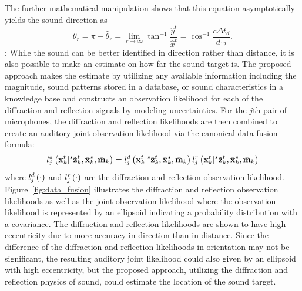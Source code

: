\documentclass[letterpaper, 10 pt, conference]{ieeeconf}  %
\begin{document}
The further mathematical manipulation shows that this equation asymptotically yields the sound direction as 
\begin{equation}\label{eq:dirction_reflection}
\theta_r = \pi - \hat \theta_r = \lim_{r \rightarrow \infty} \tan^{-1} \frac{\hat y^t}{\hat x^t}= \cos^{-1} \frac{c \Delta t_d}{d_{12}}.   
\end{equation}
: 
While the sound can be better identified in direction rather than distance, it is also possible to make an estimate on how far the sound target is.  The proposed approach makes the estimate by utilizing any available information including the magnitude, sound patterns stored in a database, or sound characteristics in a knowledge base and constructs an observation likelihood for each of the diffraction and reflection signals by modeling uncertainties.  For the $j$th pair of microphones, the diffraction and reflection likelihoods are then combined to create an auditory joint observation likelihood via the canonical data fusion formula: 
\begin{equation}\label{eq:joint_auditory}
l_j^{a} \left ( \mathbf{x}_{k}^{t}|{}^{s}\tilde {\mathbf{z}}_{k}^{t},\bar {\mathbf{x}}_{k}^{s},\bar {\mathbf{m}}_{k} \right ) = l_j^{d} \left ( \mathbf{x}_{k}^{t}|{}^{s}\tilde {\mathbf{z}}_{k}^{t},\bar {\mathbf{x}}_{k}^{s},\bar {\mathbf{m}}_{k} \right ) l_j^{r} \left ( \mathbf{x}_{k}^{t}|{}^{s}\tilde {\mathbf{z}}_{k}^{t},\bar {\mathbf{x}}_{k}^{s},\bar {\mathbf{m}}_{k} \right ) 
\end{equation}
where $l_j^{d} \left ( \cdot \right )$ and $l_j^{r} \left ( \cdot \right )$ are the diffraction and reflection observation likelihood.  
Figure~\ref{fig:data_fusion} illustrates the diffraction and reflection observation likelihoods as well as the joint observation likelihood where the observation likelihood is represented by an ellipsoid indicating a probability distribution with a covariance.  The diffraction and reflection likelihoods are shown to have high eccentricity due to more accuracy in direction than in distance.  Since the difference of the diffraction and reflection likelihoods in orientation may not be significant, the resulting auditory joint likelihood could also given by an ellipsoid with high eccentricity, but the proposed approach, utilizing the diffraction and reflection physics of sound, could estimate the location of the sound target.  
\end{document}

